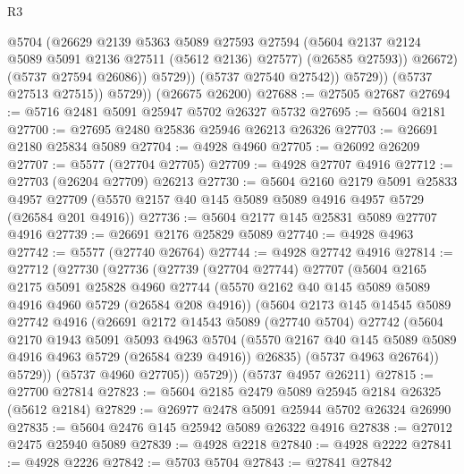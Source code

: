 \begin{lexlean}{R3}
\begin{coremodule}
                        @5704
                        (@26629
                          @2139
                          @5363
                          @5089
                          @27593
                          @27594
                          (@5604 @2137 @2124 @5089 @5091 @2136 @27511 (@5612 @2136) @27577)
                          (@26585 @27593))
                        @26672)
                      (@5737 @27594 @26086))
                    @5729))
                (@5737 @27540 @27542))
              @5729))
          (@5737 @27513 @27515))
        @5729))
    (@26675 @26200)
@27688 := @27505 @27687
@27694 := @5716 @2481 @5091 @25947 @5702 @26327 @5732
@27695 := @5604 @2181
@27700 := @27695 @2480 @25836 @25946 @26213 @26326
@27703 := @26691 @2180 @25834 @5089
@27704 := @4928 @4960
@27705 := @26092 @26209
@27707 := @5577 (@27704 @27705)
@27709 := @4928 @27707 @4916
@27712 := @27703 (@26204 @27709) @26213
@27730 := @5604
    @2160
    @2179
    @5091
    @25833
    @4957
    @27709
    (@5570 @2157 @40 @145 @5089 @5089 @4916 @4957 @5729 (@26584 @201 @4916))
@27736 := @5604 @2177 @145 @25831 @5089 @27707 @4916
@27739 := @26691 @2176 @25829 @5089
@27740 := @4928 @4963
@27742 := @5577 (@27740 @26764)
@27744 := @4928 @27742 @4916
@27814 := @27712
    (@27730
      (@27736
        (@27739
          (@27704 @27744)
          @27707
          (@5604
            @2165
            @2175
            @5091
            @25828
            @4960
            @27744
            (@5570 @2162 @40 @145 @5089 @5089 @4916 @4960 @5729 (@26584 @208 @4916))
            (@5604
              @2173
              @145
              @14545
              @5089
              @27742
              @4916
              (@26691
                @2172
                @14543
                @5089
                (@27740 @5704)
                @27742
                (@5604
                  @2170
                  @1943
                  @5091
                  @5093
                  @4963
                  @5704
                  (@5570 @2167 @40 @145 @5089 @5089 @4916 @4963 @5729 (@26584 @239 @4916))
                  @26835)
                (@5737 @4963 @26764))
              @5729))
          (@5737 @4960 @27705))
        @5729))
    (@5737 @4957 @26211)
@27815 := @27700 @27814
@27823 := @5604 @2185 @2479 @5089 @25945 @2184 @26325 (@5612 @2184)
@27829 := @26977 @2478 @5091 @25944 @5702 @26324 @26990
@27835 := @5604 @2476 @145 @25942 @5089 @26322 @4916
@27838 := @27012 @2475 @25940 @5089
@27839 := @4928 @2218
@27840 := @4928 @2222
@27841 := @4928 @2226
@27842 := @5703 @5704
@27843 := @27841 @27842

\end{coremodule}
\end{lexlean}
